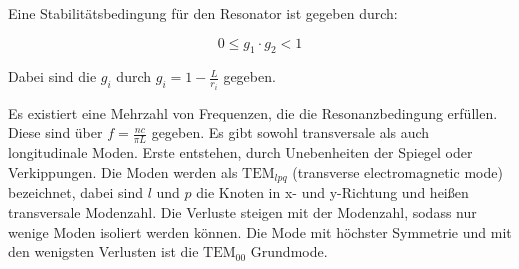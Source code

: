 \noindent Eine Stabilitätsbedingung für den Resonator ist gegeben durch:

\begin{equation}
0\le g_1\cdot g_2<1
\end{equation}

\noindent Dabei sind die \(g_i\) durch \(g_i=1-\frac{L}{r_i}\) gegeben.

\noindent Es existiert eine Mehrzahl von Frequenzen, die die Resonanzbedingung erfüllen. Diese sind über \(f=\frac{nc}{\pi L}\) gegeben. Es gibt sowohl transversale als auch longitudinale Moden. Erste entstehen, durch Unebenheiten der Spiegel oder Verkippungen. Die Moden werden als \(\text{TEM}_{lpq}\) (transverse electromagnetic mode) bezeichnet, dabei sind \(l\) und \(p\) die Knoten in x- und y-Richtung und heißen transversale Modenzahl. Die Verluste steigen mit der Modenzahl, sodass nur wenige Moden isoliert werden können. Die Mode mit höchster Symmetrie und mit den wenigsten Verlusten ist die \(\text{TEM}_00\) Grundmode.